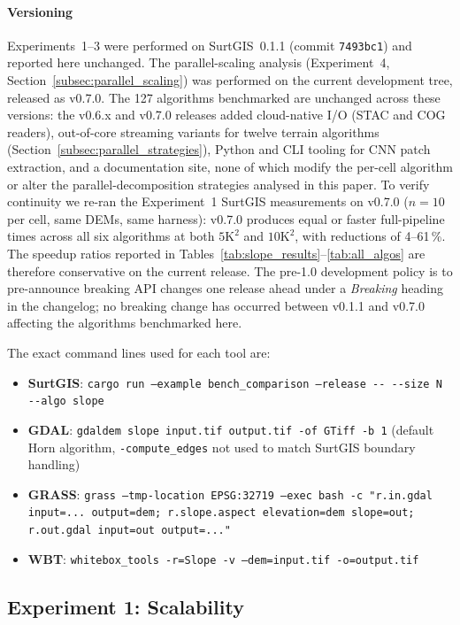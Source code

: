 \documentclass[preprint,review,12pt,authoryear]{elsarticle}
\begin{document}
\paragraph{Versioning} Experiments~1--3 were performed on SurtGIS~0.1.1 (commit \texttt{7493bc1}) and reported here unchanged. The parallel-scaling analysis (Experiment~4, Section~\ref{subsec:parallel_scaling}) was performed on the current development tree, released as v0.7.0. The 127 algorithms benchmarked are unchanged across these versions: the v0.6.x and v0.7.0 releases added cloud-native I/O (STAC and COG readers), out-of-core streaming variants for twelve terrain algorithms (Section~\ref{subsec:parallel_strategies}), Python and CLI tooling for CNN patch extraction, and a documentation site, none of which modify the per-cell algorithm or alter the parallel-decomposition strategies analysed in this paper. To verify continuity we re-ran the Experiment~1 SurtGIS measurements on v0.7.0 ($n=10$ per cell, same DEMs, same harness): v0.7.0 produces equal or faster full-pipeline times across all six algorithms at both $5\text{K}^2$ and $10\text{K}^2$, with reductions of 4--61\,\%. The speedup ratios reported in Tables~\ref{tab:slope_results}--\ref{tab:all_algos} are therefore conservative on the current release. The pre-1.0 development policy is to pre-announce breaking API changes one release ahead under a \emph{Breaking} heading in the changelog; no breaking change has occurred between v0.1.1 and v0.7.0 affecting the algorithms benchmarked here.

The exact command lines used for each tool are:
\begin{itemize}
    \item \textbf{SurtGIS}: \texttt{cargo run --example bench\_comparison --release -{-} -{-}size N -{-}algo slope}
    \item \textbf{GDAL}: \texttt{gdaldem slope input.tif output.tif -of GTiff -b 1} (default Horn algorithm, \texttt{-compute\_edges} not used to match SurtGIS boundary handling)
    \item \textbf{GRASS}: \texttt{grass --tmp-location EPSG:32719 --exec bash -c "r.in.gdal input=... output=dem; r.slope.aspect elevation=dem slope=out; r.out.gdal input=out output=..."}
    \item \textbf{WBT}: \texttt{whitebox\_tools -r=Slope -v --dem=input.tif -o=output.tif}
\end{itemize}

\subsection{Experiment 1: Scalability}
\label{subsec:scalability}
\end{document}
